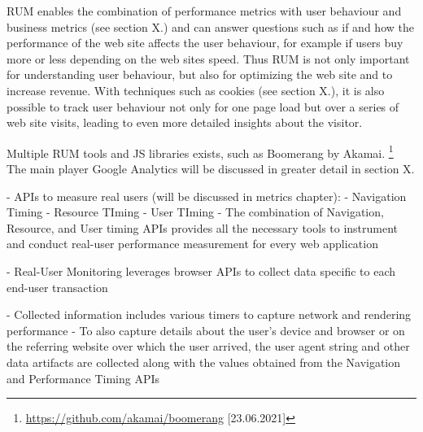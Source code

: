RUM enables the combination of performance metrics with user behaviour and business metrics (see section X.) and can answer questions such as if and how the performance of the web site affects the user behaviour, for example if users buy more or less depending on the web sites speed.%
Thus RUM is not only important for understanding user behaviour, but also for optimizing the web site and to increase revenue.
With techniques such as cookies (see section X.), it is also possible to track user behaviour not only for one page load but over a series of web site visits, leading to even more detailed insights about the visitor. %



Multiple RUM tools and JS libraries exists, such as Boomerang by Akamai. \footnote{\url{https://github.com/akamai/boomerang} [23.06.2021]}
The main player Google Analytics will be discussed in greater detail in section X.






- APIs to measure real users (will be discussed in metrics chapter):
- Navigation Timing
- Resource TIming
- User TIming
- The combination of Navigation, Resource, and User timing APIs provides all the necessary tools to instrument and conduct real-user performance measurement for every web application

- Real-User Monitoring leverages browser APIs to collect data specific to each end-user transaction

- Collected information includes various timers to capture network and rendering performance
- To also capture details about the user’s device and browser or on the referring website over which the user arrived, the user agent string and other data artifacts are collected along with the values obtained from the Navigation and Performance Timing APIs


